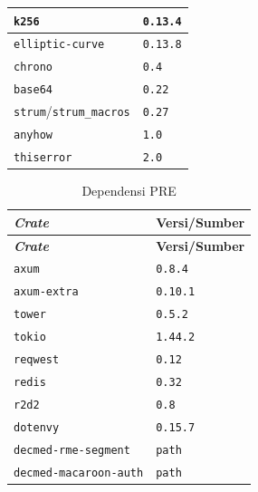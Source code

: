 \begin{longtable}{|>{\raggedright\arraybackslash}p{}|>{\raggedright\arraybackslash}p{}|}
	\texttt{k256}                         & \texttt{0.13.4}           \\ \hline
	\texttt{elliptic-curve}               & \texttt{0.13.8}           \\ \hline
	\texttt{chrono}                       & \texttt{0.4}              \\ \hline
	\texttt{base64}                       & \texttt{0.22}             \\ \hline
	\texttt{strum}/\texttt{strum\_macros} & \texttt{0.27}             \\ \hline
	\texttt{anyhow}                       & \texttt{1.0}              \\ \hline
	\texttt{thiserror}                    & \texttt{2.0}              \\ \hline
\end{longtable}

\begin{longtable}{|>{\raggedright\arraybackslash}p{}|>{\raggedright\arraybackslash}p{}|}
	\caption{Dependensi PRE}
	\label{tab:dependensi-backend-pre}                    \\
	\hline
	\textbf{\textit{Crate}}       & \textbf{Versi/Sumber} \\
	\hline
	\endfirsthead
	\hline
	\textbf{\textit{Crate}}       & \textbf{Versi/Sumber} \\
	\hline
	\endhead

	\texttt{axum}                 & \texttt{0.8.4}        \\ \hline
	\texttt{axum-extra}           & \texttt{0.10.1}       \\ \hline
	\texttt{tower}                & \texttt{0.5.2}        \\ \hline
	\texttt{tokio}                & \texttt{1.44.2}       \\ \hline
	\texttt{reqwest}              & \texttt{0.12}         \\ \hline
	\texttt{redis}                & \texttt{0.32}         \\ \hline
	\texttt{r2d2}                 & \texttt{0.8}          \\ \hline
	\texttt{dotenvy}              & \texttt{0.15.7}       \\ \hline
	\texttt{decmed-rme-segment}   & \texttt{path}         \\ \hline
	\texttt{decmed-macaroon-auth} & \texttt{path}         \\ \hline
\end{longtable}

